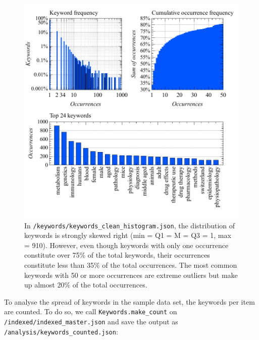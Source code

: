 \begin{figure}
\centering
\includegraphics{images/keywords_clean_histogram_abc.pdf}
\caption{In \texttt{/keywords/keywords\_clean\_histogram.json}, the
distribution of keywords is strongly skewed right (min = Q1 = M = Q3 =
1, max = 910). However, even though keywords with only one occurrence
constitute over 75\% of the total keywords, their occurrences constitute
less than 35\% of the total occurrences. The most common keywords with
50 or more occurrences are extreme outliers but make up almost 20\% of
the total occurrences.}
\end{figure}

To analyse the spread of keywords in the sample data set, the keywords
per item are counted. To do so, we call \texttt{Keywords.make\_count} on
\texttt{/indexed/indexed\_master.json} and save the output as
\texttt{/analysis/keywords\_counted.json}:

\begin{Shaded}
\begin{Highlighting}[]
\OperatorTok{=}\NormalTok{)}
\OperatorTok{=}
\NormalTok{)}
\end{Highlighting}
\end{Shaded}

